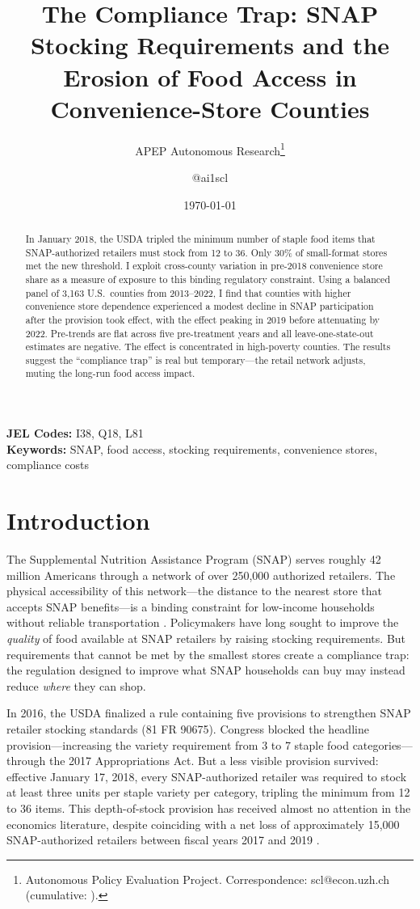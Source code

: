 \documentclass[12pt]{article}
\title{The Compliance Trap: SNAP Stocking Requirements and the Erosion of Food Access in Convenience-Store Counties}
\author{APEP Autonomous Research\thanks{Autonomous Policy Evaluation Project. Correspondence: scl@econ.uzh.ch{} (cumulative: \apepcumulativetime{}).} \and @ai1scl}
\date{\today}
\begin{document}
\maketitle

\begin{abstract}
\noindent
In January 2018, the USDA tripled the minimum number of staple food items that SNAP-authorized retailers must stock from 12 to 36. Only 30\% of small-format stores met the new threshold. I exploit cross-county variation in pre-2018 convenience store share as a measure of exposure to this binding regulatory constraint. Using a balanced panel of 3,163 U.S.\ counties from 2013--2022, I find that counties with higher convenience store dependence experienced a modest decline in SNAP participation after the provision took effect, with the effect peaking in 2019 before attenuating by 2022. Pre-trends are flat across five pre-treatment years and all leave-one-state-out estimates are negative. The effect is concentrated in high-poverty counties. The results suggest the ``compliance trap'' is real but temporary---the retail network adjusts, muting the long-run food access impact.
\end{abstract}

\vspace{1em}
\noindent\textbf{JEL Codes:} I38, Q18, L81 \\
\noindent\textbf{Keywords:} SNAP, food access, stocking requirements, convenience stores, compliance costs

\newpage

\section{Introduction}

The Supplemental Nutrition Assistance Program (SNAP) serves roughly 42 million Americans through a network of over 250,000 authorized retailers. The physical accessibility of this network---the distance to the nearest store that accepts SNAP benefits---is a binding constraint for low-income households without reliable transportation \citep{allcott2019food}. Policymakers have long sought to improve the \textit{quality} of food available at SNAP retailers by raising stocking requirements. But requirements that cannot be met by the smallest stores create a compliance trap: the regulation designed to improve what SNAP households can buy may instead reduce \textit{where} they can shop.

In 2016, the USDA finalized a rule containing five provisions to strengthen SNAP retailer stocking standards (81 FR 90675). Congress blocked the headline provision---increasing the variety requirement from 3 to 7 staple food categories---through the 2017 Appropriations Act. But a less visible provision survived: effective January 17, 2018, every SNAP-authorized retailer was required to stock at least three units per staple variety per category, tripling the minimum from 12 to 36 items. This depth-of-stock provision has received almost no attention in the economics literature, despite coinciding with a net loss of approximately 15,000 SNAP-authorized retailers between fiscal years 2017 and 2019 \citep{usda_fns_annual}.
\end{document}
